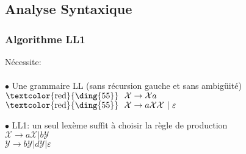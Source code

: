 \subsection{Analyse Syntaxique}

\begin{frame}
    
\end{frame}

\begin{frame}
    \frametitle{Algorithme LL1\esp}

    Nécessite:\\
    \vspace{0.05cm}\\{
    $\bullet$ Une grammaire LL (sans récursion gauche et sans ambigüité)\\
    $\text{\textcolor{red}{\ding{55}}} \ \ \mathcal{X} \rightarrow \mathcal{X}a$\\
    $\text{\textcolor{red}{\ding{55}}} \ \  \mathcal{X} \rightarrow a\mathcal{X}\mathcal{X} \ | \ \varepsilon  $\\}
    

    
    \vspace{0.25cm}
    $\bullet$ LL1: un seul lexème suffit à choisir la règle de production\\
    $\mathcal{X} \rightarrow a\mathcal{X} | b\mathcal{Y} $\\
    $\mathcal{Y} \rightarrow b\mathcal{Y} | d\mathcal{Y} | \varepsilon $
    
\end{frame}

